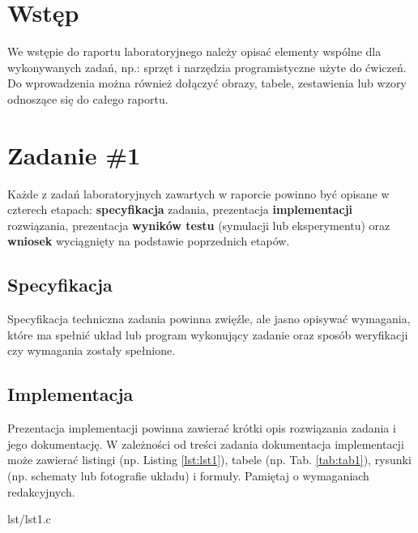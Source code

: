 \documentclass[11pt, a4paper]{article}
\institute{Instytut Robotyki i Inteligencji Maszynowej}
\date{\guillemotleft DD-MM-YYYY\guillemotright}
\begin{document}
\mainpage
\newpage

\tableofcontents
\thispagestyle{fancy}
\newpage

\section*{Wstęp} 
We wstępie do raportu laboratoryjnego należy opisać elementy wspólne dla wykonywanych zadań, np.: sprzęt i narzędzia programistyczne użyte do ćwiczeń. Do wprowadzenia można również dołączyć obrazy, tabele, zestawienia lub wzory odnoszące się do całego raportu.

\section{Zadanie \#1}
Każde z zadań laboratoryjnych zawartych w raporcie powinno być opisane w czterech etapach: \textbf{specyfikacja} zadania, prezentacja \textbf{implementacji} rozwiązania, prezentacja \textbf{wyników testu} (symulacji lub eksperymentu) oraz \textbf{wniosek} wyciągnięty na podstawie poprzednich etapów.

\subsection{Specyfikacja}
Specyfikacja techniczna zadania powinna zwięźle, ale jasno opisywać wymagania, które ma spełnić układ lub program wykonujący zadanie oraz sposób weryfikacji czy wymagania zostały spełnione.

\subsection{Implementacja}
Prezentacja implementacji powinna zawierać krótki opis rozwiązania zadania i jego dokumentację. W zależności od treści zadania dokumentacja implementacji może zawierać listingi (np. Listing \ref{lst:lst1}), tabele (np. Tab. \ref{tab:tab1}), rysunki (np. schematy lub fotografie układu) i formuły. Pamiętaj o wymaganiach redakcyjnych.


{lst/lst1.c} 

\vspace{0.5cm}
\end{document}
